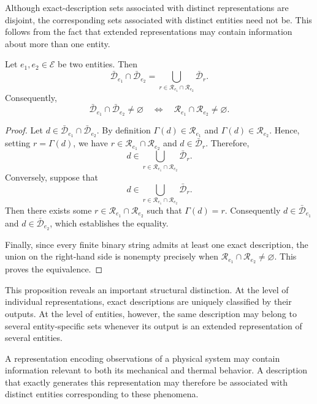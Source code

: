 Although exact-description sets associated with distinct representations are disjoint, the corresponding sets associated with distinct entities need not be. This follows from the fact that extended representations may contain information about more than one entity.

\begin{proposition}
\label{prop:exact_descriptions_entity_intersection}
Let $e_1,e_2\in\mathcal{E}$ be two entities. Then
\[
\bar{\mathcal{D}}_{e_1} \cap \bar{\mathcal{D}}_{e_2} = 
\bigcup_{r\in\mathcal{R}_{e_1}\cap\mathcal{R}_{e_2}} \bar{\mathcal{D}}_r.
\]
Consequently,
\[
\bar{\mathcal{D}}_{e_1} \cap \bar{\mathcal{D}}_{e_2} \neq\varnothing
\quad\Longleftrightarrow\quad
\mathcal{R}_{e_1} \cap \mathcal{R}_{e_2} \neq\varnothing.
\]
\end{proposition}
\begin{proof}
Let $d \in \bar{\mathcal{D}}_{e_1} \cap \bar{\mathcal{D}}_{e_2}$. By definition $\Gamma(d)\in\mathcal{R}_{e_1}$ and $\Gamma(d)\in\mathcal{R}_{e_2}$. Hence, setting $r=\Gamma(d)$, we have $r\in\mathcal{R}_{e_1}\cap\mathcal{R}_{e_2}$ and $d\in\bar{\mathcal{D}}_r$. Therefore,
\[
d \in \bigcup_{r\in\mathcal{R}_{e_1}\cap\mathcal{R}_{e_2}} \bar{\mathcal{D}}_r.
\]
Conversely, suppose that
\[
d \in \bigcup_{r\in\mathcal{R}_{e_1}\cap\mathcal{R}_{e_2}} \bar{\mathcal{D}}_r.
\]
Then there exists some $r\in\mathcal{R}_{e_1}\cap\mathcal{R}_{e_2}$ such that $\Gamma(d)=r$. Consequently $d\in\bar{\mathcal{D}}_{e_1}$ and $d\in\bar{\mathcal{D}}_{e_2}$, which establishes the equality.

Finally, since every finite binary string admits at least one exact description, the union on the right-hand side is nonempty precisely when $\mathcal{R}_{e_1} \cap \mathcal{R}_{e_2} \neq \varnothing$. This proves the equivalence.
\end{proof}

This proposition reveals an important structural distinction. At the level of individual representations, exact descriptions are uniquely classified by their outputs. At the level of entities, however, the same description may belong to several entity-specific sets whenever its output is an extended representation of several entities.

\begin{example}
A representation encoding observations of a physical system may contain information relevant to both its mechanical and thermal behavior. A description that exactly generates this representation may therefore be associated with distinct entities corresponding to these phenomena.
\end{example}

